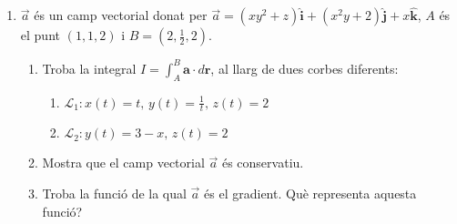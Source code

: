 \documentclass[]{book}
\newcommand\uvec[1]{\textbf{#1}}
\begin{document}
\begin{enumerate}
\item $\vec{a}$ és un camp vectorial donat per $\vec{a}=(xy^2+z)\hat{\uvec{i}}+(x^2y+2)\hat{\uvec{j}}+x\hat{\uvec{k}}$, $A$ és el punt $(1,1,2)$ i $B=(2,\frac{1}{2},2)$.
\begin{enumerate}
  \item Troba la integral $I=\int_A^B \uvec{a} \cdot d\uvec{r}$,
 al llarg de dues corbes diferents:
\begin{enumerate}
  \item $\mathcal{L}_1: x(t)=t, \, y(t)=\frac{1}{t}, \, z(t)=2$
  \item $\mathcal{L}_2: y(t)=3-x, \, z(t)=2$
\end{enumerate}
\item Mostra que el camp vectorial $\vec{a}$ és conservatiu.
\item Troba la funció de la qual $\vec{a}$ és el gradient. Què representa aquesta funció?
\end{enumerate}\end{enumerate}
\end{document}
